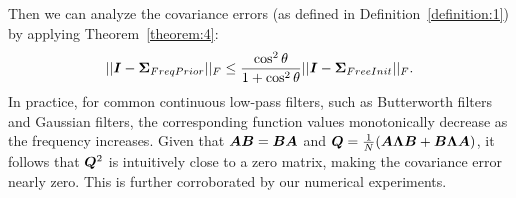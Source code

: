 Then we can analyze the covariance errors (as defined in Definition~\ref{definition:1}) by applying Theorem~\ref{theorem:4}:
\begin{equation}
    ||{\bm{I}}-\mathbf{\Sigma}_{FreqPrior}||_F 
    \le \frac{\cos^2\theta}{1+\cos^2\theta}||{\bm{I}}-\mathbf{\Sigma}_{FreeInit}||_F. 
\end{equation}
In practice, for common continuous low-pass filters, such as Butterworth filters and Gaussian filters, the corresponding function values monotonically decrease as the frequency increases. 
Given that ${\bm{A}}{\bm{B}}={\bm{B}}{\bm{A}}$ and ${\bm{Q}}=\frac{1}{N}({\bm{A}}{\bm{\Lambda}}{\bm{B}}+{\bm{B}}{\bm{\Lambda}}{\bm{A}})$, it follows that ${\bm{Q}}^2$ is intuitively close to a zero matrix, making the covariance error nearly zero. This is further corroborated by our numerical experiments.

